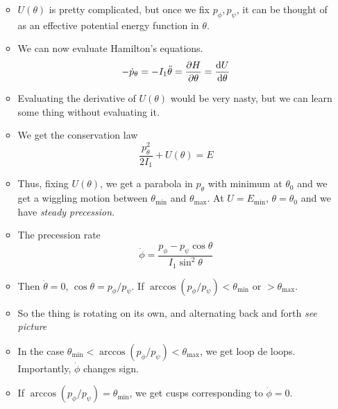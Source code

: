 \documentclass[../notes.tex]{subfiles}
\begin{document}
\begin{itemize}
\begin{itemize}
\begin{equation*}
        \end{equation*}
        \item $U(\theta)$ is pretty complicated, but once we fix $p_\phi,p_\psi$, it can be thought of as an effective potential energy function in $\theta$.
        \item We can now evaluate Hamilton's equations.
        \begin{equation*}
            -\dot{p}_\theta = -I_1\ddot{\theta} = \pdv{H}{\theta} = \dv{U}{\theta}
        \end{equation*}
        \item Evaluating the derivative of $U(\theta)$ would be very nasty, but we can learn some thing without evaluating it.
        \item We get the conservation law
        \begin{equation*}
            \frac{p_\theta^2}{2I_1}+U(\theta) = E
        \end{equation*}
        \item Thus, fixing $U(\theta)$, we get a parabola in $p_\theta$ with minimum at $\theta_0$ and we get a wiggling motion between $\theta_\text{min}$ and $\theta_\text{max}$. At $U=E_\text{min}$, $\theta=\theta_0$ and we have \emph{steady precession}.
        \item The precession rate
        \begin{equation*}
            \dot{\phi} = \frac{p_\phi-p_\psi\cos\theta}{I_1\sin^2\theta}
        \end{equation*}
        \item Then $\dot{\theta}=0$, $\cos\theta=p_\phi/p_\psi$. If $\arccos(p_\phi/p_\psi)<\theta_\text{min}$ or $>\theta_\text{max}$.
        \item So the thing is rotating on its own, and alternating back and forth \emph{see picture}
        \item In the case $\theta_\text{min}<\arccos(p_\phi/p_\psi)<\theta_\text{max}$, we get loop de loops. Importantly, $\dot{\phi}$ changes sign.
        \item If $\arccos(p_\phi/p_\psi)=\theta_\text{min}$, we get cusps corresponding to $\dot{\phi}=0$.
    \end{itemize}
\end{itemize}
\end{document}
